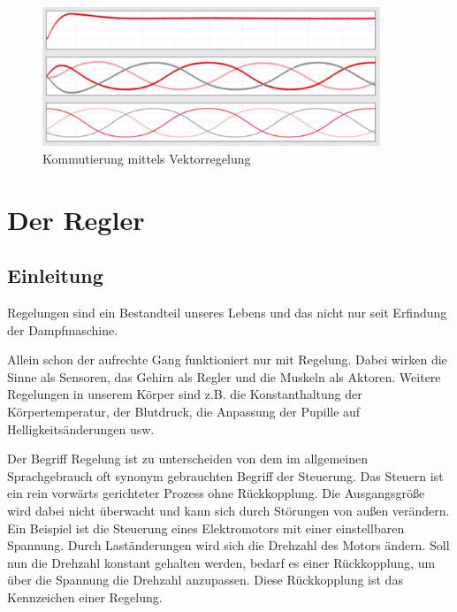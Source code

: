 {{\begin{figure}[H]
	\begin{center}
		\includegraphics[width=0.9\textwidth]{figures/antrieb/Kommutierung_Vektorregelung.png}
		\caption{Kommutierung mittels Vektorregelung\cite{Feldorientierte-Antriebssteuerung}}
	\end{center}
\end{figure}


\newpage



\section{Der Regler}
\subsection{Einleitung}
Regelungen sind ein Bestandteil unseres Lebens und das nicht nur seit Erfindung der Dampfmaschine.

Allein schon der aufrechte Gang funktioniert nur mit Regelung. Dabei wirken die Sinne als Sensoren, das Gehirn als Regler und die Muskeln als Aktoren. Weitere Regelungen in unserem Körper sind z.B. die Konstanthaltung der Körpertemperatur, der Blutdruck, die Anpassung der Pupille auf Helligkeitsänderungen usw.

Der Begriff Regelung ist zu unterscheiden von dem im allgemeinen Sprachgebrauch oft synonym gebrauchten Begriff der Steuerung. Das Steuern ist ein rein vorwärts gerichteter Prozess ohne Rückkopplung. Die Ausgangsgröße wird dabei nicht überwacht und kann sich durch Störungen von außen verändern. Ein Beispiel ist die Steuerung eines Elektromotors mit einer einstellbaren Spannung. Durch Laständerungen wird sich die Drehzahl des Motors ändern. Soll nun die Drehzahl konstant gehalten werden, bedarf es einer Rückkopplung, um über die Spannung die Drehzahl anzupassen. Diese Rückkopplung ist das Kennzeichen einer Regelung.

}}

